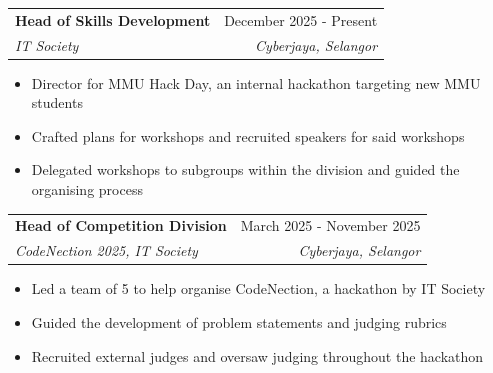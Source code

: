 \documentclass[letterpaper,11pt]{article}
\makeatletter
\newcommand{\resumeItem}[1]{
  \item\small{
    {#1 \vspace{-2pt}}
  }
}
\newcommand{\resumeSubheading}[4]{
  \vspace{-2pt}\item
    \begin{tabular*}{0.97\textwidth}[t]{l@{\extracolsep{\fill}}r}
      \textbf{#1} & #2 \\
      \textit{\small#3} & \textit{\small #4} \\
    \end{tabular*}\vspace{-7pt}
}
\newcommand{\resumeSubSubheading}[2]{
    \item
    \begin{tabular*}{0.97\textwidth}{l@{\extracolsep{\fill}}r}
      \textit{\small#1} & \textit{\small #2} \\
    \end{tabular*}\vspace{-7pt}
}
\newcommand{\resumeSubHeadingListEnd}{\end{itemize}}
\newcommand{\resumeItemListStart}{\begin{itemize}}
\newcommand{\resumeItemListEnd}{\end{itemize}\vspace{-5pt}}
\makeatother
\begin{document}
    \resumeSubheading
        {Head of Skills Development}{December 2025 - Present}
        {IT Society}{Cyberjaya, Selangor}
        \resumeItemListStart
            \resumeItem{Director for MMU Hack Day, an internal hackathon targeting new MMU students}
            \resumeItem{Crafted plans for workshops and recruited speakers for said workshops}
            \resumeItem{Delegated workshops to subgroups within the division and guided the organising process}
        \resumeItemListEnd
    \resumeSubheading
        {Head of Competition Division}{March 2025 - November 2025}
        {CodeNection 2025, IT Society}{Cyberjaya, Selangor}
        \resumeItemListStart
            \resumeItem{Led a team of 5 to help organise CodeNection, a hackathon by IT Society}
            \resumeItem{Guided the development of problem statements and judging rubrics}
            \resumeItem{Recruited external judges and oversaw judging throughout the hackathon}
        \resumeItemListEnd

      


\end{document}
